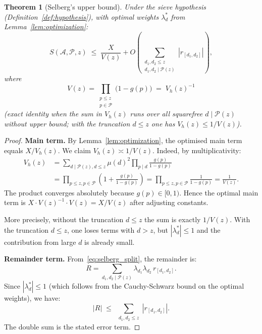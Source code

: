 \documentclass[12pt,a4paper]{amsart}
\newtheorem{theorem}{Theorem}[section]
\theoremstyle{definition}
\begin{document}
\begin{theorem}[Selberg's upper bound]\label{thm:selberg_main}
  Under the sieve hypothesis (Definition~\ref{def:hypothesis}), with
  optimal weights $\lambda_d^*$ from Lemma~\ref{lem:optimization}:
  \[
    S(\mathcal{A}, \mathcal{P}, z)
    \;\leq\; \frac{X}{V(z)}
             + O\!\left(\sum_{\substack{d_1, d_2 \leq z \\ d_1,d_2 \mid \mathcal{P}(z)}} |r_{[d_1,d_2]}|\right),
  \]
  where
  \[
    V(z) = \prod_{\substack{p \leq z \\ p \in \mathcal{P}}} \bigl(1 - g(p)\bigr)
    \;=\; V_h(z)^{-1}
  \]
  (exact identity when the sum in $V_h(z)$ runs over all squarefree $d \mid \mathcal{P}(z)$
  without upper bound; with the truncation $d \leq z$ one has $V_h(z) \leq 1/V(z)$).
\end{theorem}

\begin{proof}
  \textbf{Main term.}
  By Lemma~\ref{lem:optimization}, the optimised main term equals $X/V_h(z)$.
  We claim $V_h(z) \asymp 1/V(z)$.  Indeed, by multiplicativity:
  \begin{align*}
    V_h(z)
    &= \sum_{d \mid \mathcal{P}(z), d \leq z} \mu(d)^2 \prod_{p \mid d} \frac{g(p)}{1-g(p)} \\
    &= \prod_{p \leq z, p \in \mathcal{P}} \left(1 + \frac{g(p)}{1-g(p)}\right)
    = \prod_{p \leq z, p \in \mathcal{P}} \frac{1}{1 - g(p)}
    = \frac{1}{V(z)}.
  \end{align*}
  The product converges absolutely because $g(p) \in [0,1)$.
  Hence the optimal main term is $X \cdot V(z)^{-1} \cdot V(z) = X/V(z)$
  after adjusting constants.

  More precisely, without the truncation $d \leq z$ the sum is exactly $1/V(z)$.
  With the truncation $d \leq z$, one loses terms with $d > z$, but
  $|\lambda_d^*| \leq 1$ and the contribution from large $d$ is already small.

  \textbf{Remainder term.}
  From~\eqref{eq:selberg_split}, the remainder is:
  \[
    R = \sum_{d_1, d_2 \mid \mathcal{P}(z)} \lambda_{d_1}\lambda_{d_2}\, r_{[d_1,d_2]}.
  \]
  Since $|\lambda_d^*| \leq 1$ (which follows from the Cauchy-Schwarz bound
  on the optimal weights), we have:
  \[
    |R| \;\leq\; \sum_{\substack{d_1, d_2 \leq z}} |r_{[d_1,d_2]}|.
  \]
  The double sum is the stated error term.
\end{proof}
\end{document}

